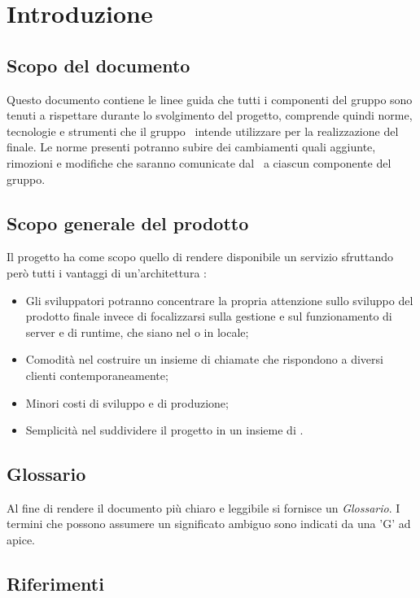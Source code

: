 \section{Introduzione}\label{Introduzione}
\subsection{Scopo del documento}\label{ScopoDocumento}
Questo documento contiene le linee guida che tutti i componenti del gruppo sono tenuti a rispettare durante lo svolgimento del progetto, comprende quindi norme, tecnologie e strumenti che il gruppo \Gruppo\ intende utilizzare per la realizzazione del  finale. 
Le norme presenti potranno subire dei cambiamenti quali aggiunte, rimozioni e modifiche che saranno comunicate dal \Responsabile\ a ciascun componente del gruppo.

\subsection{Scopo generale del prodotto}
Il progetto {\NomeProgetto} ha come scopo quello di rendere disponibile un servizio  sfruttando però tutti i vantaggi di un'architettura :
\begin{itemize}
    \item Gli sviluppatori potranno concentrare la propria attenzione sullo sviluppo del prodotto finale invece di focalizzarsi sulla gestione e sul funzionamento di server e di runtime, che siano nel  o in locale;
    \item Comodità nel costruire un insieme di chiamate  che rispondono a diversi clienti contemporaneamente;
    \item Minori costi di sviluppo e di produzione;
    \item Semplicità nel suddividere il progetto in un insieme di .
\end{itemize}

\subsection{Glossario}\label{Glossario}
Al fine di rendere il documento più chiaro e leggibile si fornisce un \textit{Glossario}. I termini che possono assumere un significato ambiguo sono indicati da una 'G' ad apice.

\subsection{Riferimenti}
